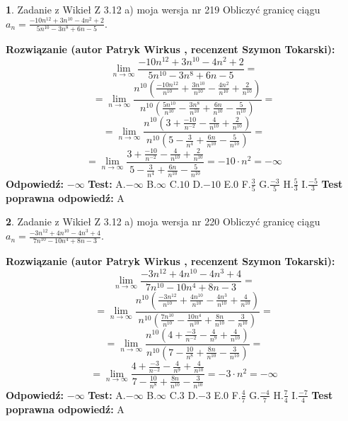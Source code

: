 \documentclass[12pt, a4paper]{article}
\theoremstyle{definition} %
\newtheorem{zad}{}
\newcommand{\zadStart}[1]{\begin{zad}#1\newline}
\newcommand{\zadStop}{\end{zad}}
\newcommand{\rozwStart}[2]{\noindent \textbf{Rozwiązanie (autor #1 , recenzent #2): }\newline}
\newcommand{\rozwStop}{\newline}
\newcommand{\odpStart}{\noindent \textbf{Odpowiedź:}\newline}
\newcommand{\odpStop}{\newline}
\newcommand{\testStart}{\noindent \textbf{Test:}\newline}
\newcommand{\testStop}{\newline}
\newcommand{\kluczStart}{\noindent \textbf{Test poprawna odpowiedź:}\newline}
\newcommand{\kluczStop}{\newline}
\begin{document}
\zadStart{Zadanie z Wikieł Z 3.12 a) moja wersja nr 219}
Obliczyć granicę ciągu $a_{n}=\frac{-10n^{12}+3n^{10}-4n^{2}+2}{5n^{10}-3n^{8}+6n-5}$.
\zadStop
\rozwStart{Patryk Wirkus}{Szymon Tokarski}
$$\lim\limits_{n\to\infty}\frac{-10n^{12}+3n^{10}-4n^{2}+2}{5n^{10}-3n^{8}+6n-5}=$$
$$=\lim\limits_{n\to\infty}\frac{n^{10}\left(\frac{-10n^{12}}{n^{10}}+\frac{3n^{10}}{n^{10}}-\frac{4n^{2}}{n^{10}}+\frac{2}{n^{10}}\right)}{n^{10}\left(\frac{5n^{10}}{n^{10}}-\frac{3n^{8}}{n^{10}}+\frac{6n}{n^{10}}-\frac{5}{n^{10}}\right)}=$$
$$=\lim\limits_{n\to\infty}\frac{n^{10}\left(3+\frac{-10}{n^{-2}}-\frac{4}{n^{10}}+\frac{2}{n^{10}}\right)}
{n^{10}\left(5-\frac{3}{n^{4}}+\frac{6n}{n^{10}}-\frac{5}{n^{10}}\right)}=$$
$$=\lim\limits_{n\to\infty}\frac{3+\frac{-10}{n^{-2}}-\frac{4}{n^{10}}+\frac{2}{n^{10}}}{5-\frac{3}{n^{4}}+\frac{6n}{n^{10}}-\frac{5}{n^{10}}}=-10\cdot n^{2} = -\infty$$
\rozwStop
\odpStart
$-\infty$
\odpStop
\testStart
A.$-\infty$
B.$\infty$
C.$10$
D.$-10$
E.$0$
F.$\frac{3}{5}$
G.$\frac{-3}{5}$
H.$\frac{5}{3}$
I.$\frac{-5}{3}$
\testStop
\kluczStart
A
\kluczStop



\zadStart{Zadanie z Wikieł Z 3.12 a) moja wersja nr 220}
Obliczyć granicę ciągu $a_{n}=\frac{-3n^{12}+4n^{10}-4n^{3}+4}{7n^{10}-10n^{4}+8n-3}$.
\zadStop
\rozwStart{Patryk Wirkus}{Szymon Tokarski}
$$\lim\limits_{n\to\infty}\frac{-3n^{12}+4n^{10}-4n^{3}+4}{7n^{10}-10n^{4}+8n-3}=$$
$$=\lim\limits_{n\to\infty}\frac{n^{10}\left(\frac{-3n^{12}}{n^{10}}+\frac{4n^{10}}{n^{10}}-\frac{4n^{3}}{n^{10}}+\frac{4}{n^{10}}\right)}{n^{10}\left(\frac{7n^{10}}{n^{10}}-\frac{10n^{4}}{n^{10}}+\frac{8n}{n^{10}}-\frac{3}{n^{10}}\right)}=$$
$$=\lim\limits_{n\to\infty}\frac{n^{10}\left(4+\frac{-3}{n^{-2}}-\frac{4}{n^{9}}+\frac{4}{n^{10}}\right)}
{n^{10}\left(7-\frac{10}{n^{8}}+\frac{8n}{n^{10}}-\frac{3}{n^{10}}\right)}=$$
$$=\lim\limits_{n\to\infty}\frac{4+\frac{-3}{n^{-2}}-\frac{4}{n^{9}}+\frac{4}{n^{10}}}{7-\frac{10}{n^{8}}+\frac{8n}{n^{10}}-\frac{3}{n^{10}}}=-3\cdot n^{2} = -\infty$$
\rozwStop
\odpStart
$-\infty$
\odpStop
\testStart
A.$-\infty$
B.$\infty$
C.$3$
D.$-3$
E.$0$
F.$\frac{4}{7}$
G.$\frac{-4}{7}$
H.$\frac{7}{4}$
I.$\frac{-7}{4}$
\testStop
\kluczStart
A
\kluczStop
\end{document}
